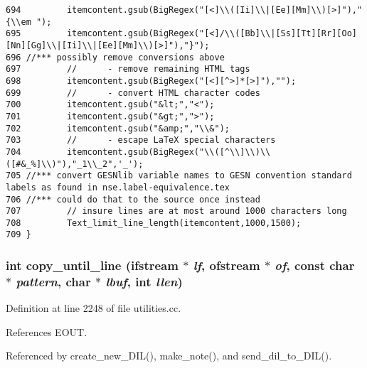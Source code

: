 \begin{verbatim}
694         itemcontent.gsub(BigRegex("[<]\\([Ii]\\|[Ee][Mm]\\)[>]"),"{\\em ");
695         itemcontent.gsub(BigRegex("[<]/\\([Bb]\\|[Ss][Tt][Rr][Oo][Nn][Gg]\\|[Ii]\\|[Ee][Mm]\\)[>]"),"}");
696 //*** possibly remove conversions above
697         //      - remove remaining HTML tags
698         itemcontent.gsub(BigRegex("[<][^>]*[>]"),"");
699         //      - convert HTML character codes
700         itemcontent.gsub("&lt;","<");
701         itemcontent.gsub("&gt;",">");
702         itemcontent.gsub("&amp;","\\&");
703         //      - escape LaTeX special characters
704         itemcontent.gsub(BigRegex("\\([^\\]\\)\\([#&_%]\\)"),"_1\\_2",'_');
705 //*** convert GESNlib variable names to GESN convention standard labels as found in nse.label-equivalence.tex
706 //*** could do that to the source once instead
707         // insure lines are at most around 1000 characters long
708         Text_limit_line_length(itemcontent,1000,1500);
709 }
\end{verbatim}\normalsize 
{}
\subsubsection{\setlength{\rightskip}{0pt plus 5cm}int copy\_\-until\_\-line (ifstream $\ast$ {\em lf}, ofstream $\ast$ {\em of}, const char $\ast$ {\em pattern}, char $\ast$ {\em lbuf}, int {\em llen})}\label{dil2al_8hh_a246}




Definition at line 2248 of file utilities.cc.

References EOUT.

Referenced by create\_\-new\_\-DIL(), make\_\-note(), and send\_\-dil\_\-to\_\-DIL().




